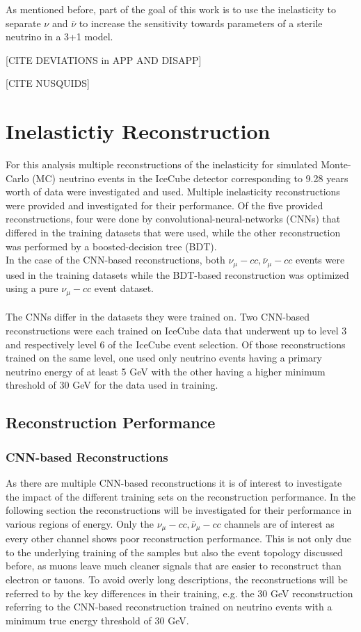 \documentclass[a4paper,12pt,numbered]{article}
\begin{document}
As mentioned before, part of the goal of this work is to use the inelasticity to separate $\nu$ and $\bar{\nu}$ to increase the sensitivity towards parameters of a sterile neutrino in a 3+1 model.

[CITE DEVIATIONS in APP AND DISAPP]

 [CITE NUSQUIDS]

\section{Inelastictiy Reconstruction}

For this analysis multiple reconstructions of the inelasticity for simulated Monte-Carlo (MC) neutrino events in the IceCube detector corresponding to 9.28 years worth of data were investigated and used. 
Multiple inelasticity reconstructions were provided and investigated for their performance. Of the five provided reconstructions, four were done by convolutional-neural-networks (CNNs) that differed in the training datasets that were used, while the other reconstruction was performed by a boosted-decision tree (BDT).
\\
In the case of the CNN-based reconstructions, both $\nu_\mu-cc, \bar{\nu}_\mu-cc$ events were used in the training datasets while the BDT-based reconstruction was optimized using a pure $\nu_\mu-cc$ event dataset.
\\ \\
The CNNs differ in the datasets they were trained on. Two CNN-based reconstructions were each trained on IceCube data that underwent up to level 3 and respectively level 6 of the IceCube event selection. Of those reconstructions trained on the same level, one used only neutrino events having a primary neutrino energy of at least 5 GeV with the other having a higher minimum threshold of 30 GeV for the data used in training.

\subsection{Reconstruction Performance}
\subsubsection{CNN-based Reconstructions}

As there are multiple CNN-based reconstructions it is of interest to investigate the impact of the different training sets on the reconstruction performance. In the following section the reconstructions will be investigated for their performance in various regions of energy. Only the $\nu_\mu-cc, \bar{\nu}_\mu-cc$ channels are of interest as every other channel shows poor reconstruction performance. This is not only due to the underlying training of the samples but also the event topology discussed before, as muons leave much cleaner signals that are easier to reconstruct than electron or tauons. To avoid overly long descriptions, the reconstructions will be referred to by the key differences in their training, e.g. the 30 GeV reconstruction referring to the CNN-based reconstruction trained on neutrino events with a minimum true energy threshold of 30 GeV.
\end{document}
